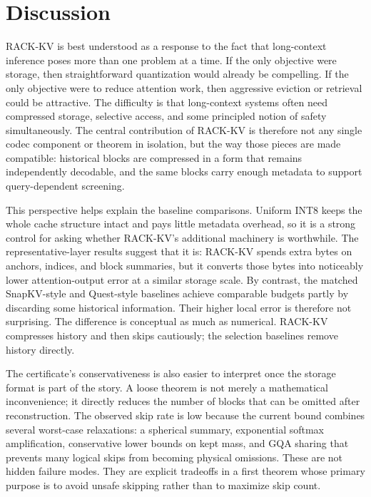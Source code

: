 \section{Discussion}

RACK-KV is best understood as a response to the fact that long-context inference poses more than one problem at a time. If the only objective were storage, then straightforward quantization would already be compelling. If the only objective were to reduce attention work, then aggressive eviction or retrieval could be attractive. The difficulty is that long-context systems often need compressed storage, selective access, and some principled notion of safety simultaneously. The central contribution of RACK-KV is therefore not any single codec component or theorem in isolation, but the way those pieces are made compatible: historical blocks are compressed in a form that remains independently decodable, and the same blocks carry enough metadata to support query-dependent screening.

This perspective helps explain the baseline comparisons. Uniform INT8 keeps the whole cache structure intact and pays little metadata overhead, so it is a strong control for asking whether RACK-KV's additional machinery is worthwhile. The representative-layer results suggest that it is: RACK-KV spends extra bytes on anchors, indices, and block summaries, but it converts those bytes into noticeably lower attention-output error at a similar storage scale. By contrast, the matched SnapKV-style and Quest-style baselines achieve comparable budgets partly by discarding some historical information. Their higher local error is therefore not surprising. The difference is conceptual as much as numerical. RACK-KV compresses history and then skips cautiously; the selection baselines remove history directly.

The certificate's conservativeness is also easier to interpret once the storage format is part of the story. A loose theorem is not merely a mathematical inconvenience; it directly reduces the number of blocks that can be omitted after reconstruction. The observed skip rate is low because the current bound combines several worst-case relaxations: a spherical summary, exponential softmax amplification, conservative lower bounds on kept mass, and GQA sharing that prevents many logical skips from becoming physical omissions. These are not hidden failure modes. They are explicit tradeoffs in a first theorem whose primary purpose is to avoid unsafe skipping rather than to maximize skip count.

